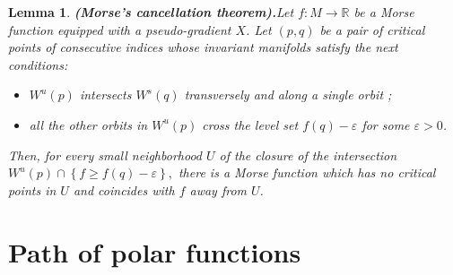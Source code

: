 \documentclass[12pt]{amsart}
\newtheorem{lemme}[thm]{Lemma}
\def\R{\mathbb{R}}
\def\ep{\varepsilon}
\begin{document}
  
   \begin{lemme}{\bf (Morse's cancellation theorem).}\label{cancel}
   Let $f:M\to \R$ be a Morse function equipped with a pseudo-gradient $X$.
   Let $(p,q)$  be a pair of critical points of consecutive indices whose invariant manifolds
   satisfy the next conditions:
   \begin{itemize}
   \item $W^u(p)$ intersects $W^s(q)$ transversely and along a single  orbit ;
   \item all the other orbits in $W^u(p)$ cross the level set $f(q)-\ep$ for some $\ep>0$.
   \end{itemize}
   Then, for every %
   small neighborhood $U$ of the closure of  the intersection
    $W^u(p)\cap \left\{f\geq f(q)-\ep\right\},$ %
   there is 
   a Morse function which has no critical points in $U$ and  coincides with $f$ away from $U$.\\
   
   \end{lemme} 
  
  


  \section{Path of polar functions}\label{s4} %
 
\end{document}
